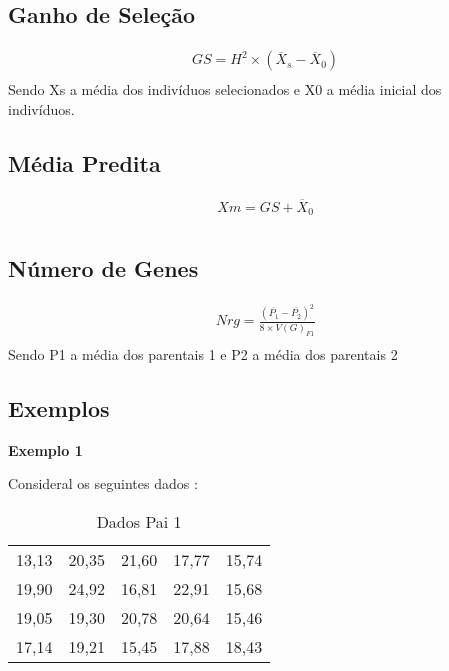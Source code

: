 \subsection{Ganho de Seleção}

\begin{definition}

\begin{align}
& GS = H^2 \times (\overline{X}_s - \overline{X}_0) \\
\end{align}
Sendo Xs a média dos indivíduos selecionados e X0 a média inicial dos indivíduos.
\end{definition}


\subsection{Média Predita}

\begin{definition}

\begin{align}
& Xm = GS + \overline{X}_0 \\
\end{align}
\end{definition}


\subsection{Número de Genes}


\begin{definition}

\begin{align}
& Nrg = \frac{(\overline{P_1} - \overline{P_2})^2}{8 \times V(G)_{F1}} \\
\end{align}
Sendo P1 a média dos parentais 1 e  P2 a média dos parentais 2 
\end{definition}

\subsection{Exemplos}

\textbf{Exemplo 1}

Consideral os seguintes dados :

\begin{table}[h]
\centering
\begin{tabular}{l l l l l}
\midrule
13,13 &  20,35 & 21,60 & 17,77 & 15,74 \\
19,90 &  24,92 & 16,81 & 22,91 & 15,68 \\
19,05 &  19,30 & 20,78 & 20,64 & 15,46 \\
17,14 &  19,21 & 15,45 & 17,88 & 18,43 \\
\end{tabular}
\caption{Dados Pai 1} \label{tab:t06}
\end{table}


